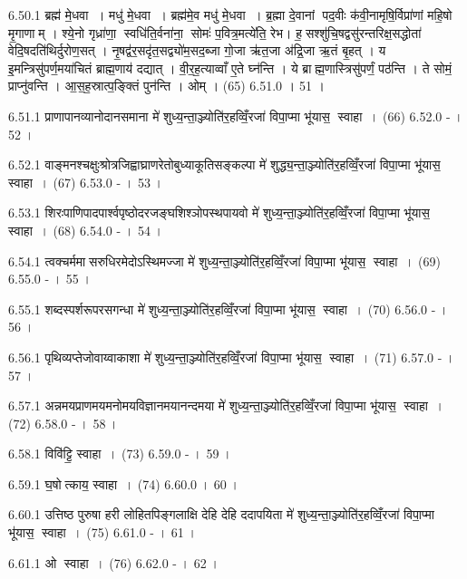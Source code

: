 6.50.1
ब्रह्म॑ मे॒धवा । मधु॑ मे॒धवा । ब्रह्म॑मे॒व मधु॑ मे॒धवा । ब्र॒ह्मा दे॒वानां पद॒वीः क॑वी॒नामृषि॒र्विप्रा॑णां महि॒षो मृ॒गाणाम् । श्ये॒नो गृध्रा॑णा॒ स्वधि॑ति॒र्वना॑ना॒ सोमः॑ प॒वित्र॒मत्ये॑ति॒ रेभ\sn{}। ह॒सश्शु॑चि॒षद्वसु॑रन्तरिक्ष॒सद्धोता॑ वेदि॒षदति॑थिर्दुरोण॒सत् । नृ॒षद्व॑र॒सदृ॑त॒सद्व्यो॑म॒सद॒ब्जा गो॒जा ऋ॑त॒जा अ॑द्रि॒जा ऋ॒तं बृ॒हत् । य इ॒मन्त्रिसु॑पर्ण॒मया॑चितं ब्राह्म॒णाय॑ दद्यात् । वी॒र॒ह॒त्याव्वाँ ए॒ते घ्न॑न्ति । ये ब्राह्म॒णास्त्रिसु॑पर्णं॒ पठ॑न्ति । ते सोमं॒ प्राप्नु॑वन्ति । आ॒स॒ह॒स्रात्प॒ङ्क्तिं पुन॑न्ति । ओम् । (65)
6.51.0
। 51 ।
\anuvakamend

6.51.1
प्राणापानव्यानोदानसमाना मे॑ शुध्य॒न्ता॒ञ्ज्योति॑र॒हव्विँ॒रजा॑ विपा॒प्मा भू॑यास॒ स्वाहा । (66)
6.52.0
- । 52 ।
\anuvakamend

6.52.1
वाङ्मनश्चक्षुःश्रोत्रजिह्वाघ्राणरेतोबुध्याकूतिसङ्कल्पा मे॑ शुद्ध्य॒न्ता॒ञ्ज्योति॑र॒हव्विँ॒रजा॑ विपा॒प्मा भू॑यास॒ स्वाहा । (67)
6.53.0
- । 53 ।
\anuvakamend

6.53.1
शिरःपाणिपादपार्श्वपृष्ठोदरजङ्घशिश्ञोपस्थपायवो मे॑ शुध्य॒न्ता॒ञ्ज्योति॑र॒हव्विँ॒रजा॑ विपा॒प्मा भू॑यास॒ स्वाहा । (68)
6.54.0
- । 54 ।
\anuvakamend

6.54.1
त्वक्चर्ममासरुधिरमेदोऽस्थिमज्जा मे॑ शुध्य॒न्ता॒ञ्ज्योति॑र॒हव्विँ॒रजा॑ विपा॒प्मा भू॑यास॒ स्वाहा । (69)
6.55.0
- । 55 ।
\anuvakamend

6.55.1
शब्दस्पर्शरूपरसगन्धा मे॑ शुध्य॒न्ता॒ञ्ज्योति॑र॒हव्विँ॒रजा॑ विपा॒प्मा भू॑यास॒ स्वाहा । (70)
6.56.0
- । 56 ।
\anuvakamend

6.56.1
पृथिव्यप्तेजोवाय्वाकाशा मे॑ शुध्य॒न्ता॒ञ्ज्योति॑र॒हव्विँ॒रजा॑ विपा॒प्मा भू॑यास॒ स्वाहा । (71)
6.57.0
- । 57 ।
\anuvakamend

6.57.1
अन्नमयप्राणमयमनोमयविज्ञानमयानन्दमया मे॑ शुध्य॒न्ता॒ञ्ज्योति॑र॒हव्विँ॒रजा॑ विपा॒प्मा भू॑यास॒ स्वाहा । (72)
6.58.0
- । 58 ।
\anuvakamend

6.58.1
विवि॑ट्टि॒ स्वाहा । (73)
6.59.0
- । 59 ।
\anuvakamend

6.59.1
घ॒षोत्काय॒ स्वाहा । (74)
6.60.0
। 60 ।
\anuvakamend

6.60.1
उत्तिष्ठ पुरुषा हरी लोहितपिङ्गलाक्षि देहि देहि ददापयिता मे॑ शुध्य॒न्ता॒ञ्ज्योति॑र॒हव्विँ॒रजा॑ विपा॒प्मा भू॑यास॒ स्वाहा । (75)
6.61.0
- । 61 ।
\anuvakamend

6.61.1
ओ स्वाहा । (76)
6.62.0
- । 62 ।
\anuvakamend

